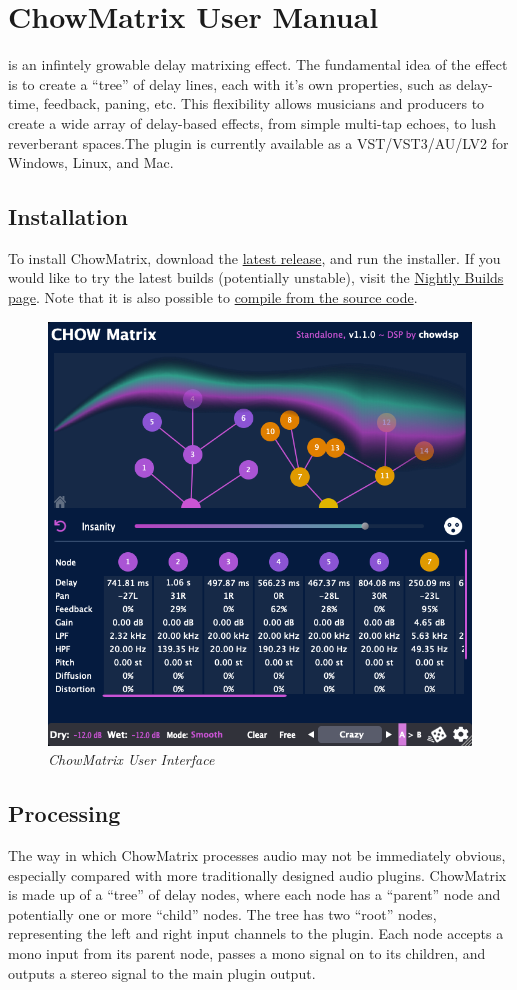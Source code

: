 \documentclass[landscape,twocolumn,a5paper]{manual}
\def\dllink#1{\href{https://chowdsp.com/products.html\#matrix}{#1}}
\begin{document}
\section{ChowMatrix User Manual}

\noindent
{} is an infintely growable delay
matrixing effect. The fundamental idea of the effect is
to create a ``tree'' of delay lines, each with it's own
properties, such as delay-time, feedback, paning, etc.
This flexibility allows musicians and producers to create
a wide array of delay-based effects, from simple multi-tap
echoes, to lush reverberant spaces.The plugin is currently
available as a VST/VST3/AU/LV2 for Windows, Linux, and Mac.

\subsection{Installation}
To install ChowMatrix, download the \dllink{latest release},
and run the installer. If you would like to try the
latest builds (potentially unstable), visit the
\href{https://chowdsp.com/nightly.html\#matrix}{Nightly Builds page}.
Note that it is also possible to
\href{https://github.com/Chowdhury-DSP/ChowMatrix#Building}{compile from the source code}.

\begin{figure}[ht]
    \center
    \includegraphics[width=0.75\columnwidth]{screenshots/full_gui.png}
    \caption{\label{fig:full_gui}{\it ChowMatrix User Interface}}
\end{figure}

\subsection{Processing}
The way in which ChowMatrix processes audio may not
be immediately obvious, especially compared with more
traditionally designed audio plugins. ChowMatrix is made up
of a ``tree'' of delay nodes, where each node has a ``parent''
node and potentially one or more ``child'' nodes. The tree has
two ``root'' nodes, representing the left and right input
channels to the plugin. Each node accepts a mono input
from its parent node, passes a mono signal on to its children,
and outputs a stereo signal to the main plugin output.
\end{document}
